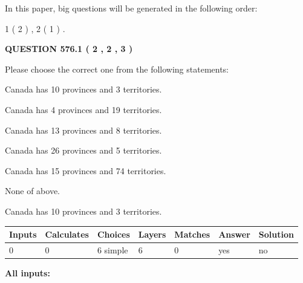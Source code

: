 \documentclass[12pt]{article}
\begin{document}
In this paper, big questions will be generated in the following order: 
   
   
   1 ( 2 )
 ,
   2 ( 1 )
 .
  
\vspace{0.2in}
  
{\textbf{\Large{QUESTION
576.1 
 ( 2 , 2 , 3 )
}}}
  
  
Please choose the correct one from the following statements:
 
 
Canada has 10  provinces and 3 territories.
 
 
Canada has   4 provinces and  19 territories.
 
 
Canada has  13 provinces and  8 territories.
 
 
Canada has  26 provinces and  5 territories.
 
 
Canada has  15 provinces and  74 territories.
 
 
 None of above.
 
 
\noindent{}
 
 
Canada has 10  provinces and 3 territories.
 
 
\noindent{}
 
 
   
   
   
   
\noindent\begin{tabular}{|l|l|l|l|l|l|l|}
 \hline
Inputs & Calculates & Choices & Layers & Matches & Answer & Solution \\ \hline
 0  & 
 0  & 
 6
  simple  
  & 
 6  & 
 0  & 
  yes & 
  no 
  \\ \hline
 \end{tabular}
   
   
   
   
\noindent{}
   
   
   
   
\noindent\vspace{0.1in}\hspace{-0.08in} {\textbf{\Large{All inputs: }}}
   
\end{document}
